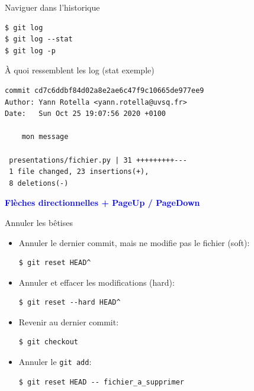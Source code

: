 \documentclass[presentation]{beamer}
\begin{document}
\begin{frame}[fragile]{Naviguer dans l'historique}
\begin{lstlisting}
$ git log
$ git log --stat
$ git log -p
\end{lstlisting}

À quoi ressemblent les log (stat exemple)
\pause
\begin{lstlisting}
commit cd7c6ddbf84d02a8e2ae6c47f9c10665de977ee9
Author: Yann Rotella <yann.rotella@uvsq.fr>
Date:   Sun Oct 25 19:07:56 2020 +0100

    mon message

 presentations/fichier.py | 31 +++++++++---
 1 file changed, 23 insertions(+), 
 8 deletions(-)
\end{lstlisting}

\pause
\textcolor{blue}{\textbf{Flèches directionnelles + PageUp / PageDown}}
\end{frame}

\begin{frame}[fragile]{Annuler les bêtises}
\begin{itemize}
	\item Annuler le dernier commit, mais ne modifie pas le fichier (soft):
\begin{lstlisting}
$ git reset HEAD^
\end{lstlisting}
\item Annuler et effacer les modifications (hard):
\begin{lstlisting}
$ git reset --hard HEAD^
\end{lstlisting}
\item Revenir au dernier commit:
\begin{lstlisting}
$ git checkout
\end{lstlisting}
\item Annuler le \texttt{git add}:
\begin{lstlisting}
$ git reset HEAD -- fichier_a_supprimer
\end{lstlisting}
\end{itemize}
\end{frame}
\end{document}
